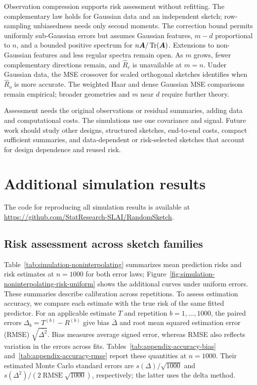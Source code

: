 \documentclass{article}
\theoremstyle{plain} %
\theoremstyle{definition} %
\theoremstyle{definition} %
\newcommand{\hR}{\hat{R}}
\begin{document}
Observation compression supports risk assessment without refitting. The
complementary law holds for Gaussian data and an independent sketch;
row-sampling unbiasedness needs only second moments. The correction bound
permits uniformly sub-Gaussian errors but assumes Gaussian features, $m-d$
proportional to $n$, and a bounded positive spectrum for
$n\boldsymbol{A}/\operatorname{Tr}(\boldsymbol{A})$. Extensions to non-Gaussian features and less regular
spectra remain open. As $m$ grows, fewer complementary directions remain,
and $\widehat R_c$ is unavailable at $m=n$. Under Gaussian data, the MSE crossover for scaled orthogonal sketches
identifies when $\hR_o$ is more accurate.
The weighted Haar and dense Gaussian MSE comparisons remain empirical;
broader geometries and $m$ near $d$ require further theory.

Assessment needs the original observations or residual summaries, adding
data and computational costs. The simulations use one covariance and
signal. Future work should study other designs, structured sketches,
end-to-end costs, compact sufficient summaries, and data-dependent or
risk-selected sketches that account for design dependence and reused risk.


\FloatBarrier

\clearpage

\clearpage
\appendix

\section{Additional simulation results}
\label{app:additional-simulations}

The code for reproducing all simulation results is available at
\url{https://github.com/StatResearch-SLAI/RandomSketch}.

\subsection{Risk assessment across sketch families}
\label{sec:simulation-noninterpolating}
\label{app:simulation-accuracy}
Table~\ref{tab:simulation-noninterpolating} summarizes mean prediction
risks and risk estimates at $n=1000$ for both error laws;
Figure~\ref{fig:simulation-noninterpolating-risk-uniform} shows the
additional curves under uniform errors. These summaries describe
calibration across repetitions. To assess estimation accuracy, we compare
each estimate with the true risk of the same fitted predictor. For an
applicable estimate $T$ and
repetition $b=1,\ldots,1000$, the paired errors $\Delta_b=T^{(b)}-R^{(b)}$ give bias $\bar\Delta$ and root mean
squared estimation error (RMSE) $\sqrt{\overline{\Delta^2}}$.
Bias measures average signed error, whereas RMSE also reflects variation
in the errors across fits. Tables~\ref{tab:appendix-accuracy-bias}
and~\ref{tab:appendix-accuracy-rmse} report these quantities at $n=1000$.
Their estimated Monte Carlo standard errors are $s(\Delta)/\sqrt{1000}$ and
$s(\Delta^2)/(2\operatorname{RMSE}\sqrt{1000})$, respectively;
the latter uses the delta method.
\end{document}
